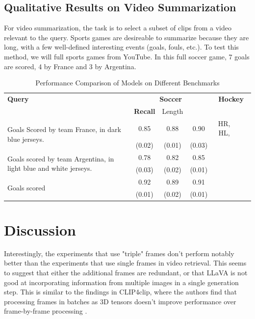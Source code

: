 \documentclass{article}
\begin{document}
\subsection{Qualitative Results on Video Summarization}
For video summarization, the task is to select a subset of clips from a video relevant to the query.
Sports games are desireable to summarize because they are long, with a few well-defined interesting events (goals, fouls, etc.).
To test this method, we will full sports games from YouTube.
In this full soccer game, 7 goals are scored, 4 by France and 3 by Argentina.

\begin{table}[htbp]
  \centering
  \begin{tabular}{lccccc}
    \toprule
    \textbf{Query} & \multicolumn{3}{c}{\textbf{Soccer}} & \multicolumn{3}{c}{\textbf{Hockey}}\\
    \cmidrule(lr){2-4}
    & \textbf{Recall} & Length \\
    \midrule
    \multirow{2}{*}{Goals Scored by team France, in dark blue jerseys.} & 0.85 & 0.88 & 0.90 & HR, HL, \\
    & (0.02) & (0.01) & (0.03) \\
    \midrule
    \multirow{2}{*}{Goals scored by team Argentina, in light blue and white jerseys.} & 0.78 & 0.82 & 0.85 \\
    & (0.03) & (0.02) & (0.01) \\
    \midrule
    \multirow{2}{*}{Goals scored} & 0.92 & 0.89 & 0.91 \\
    & (0.01) & (0.02) & (0.01) \\
    \bottomrule
  \end{tabular}
  \label{tab:video_summarization}
  \caption{Performance Comparison of Models on Different Benchmarks}
\end{table}

\section{Discussion}

Interestingly, the experiments that use "triple" frames don't perform notably better than the experiments that use single frames in video retrieval.
This seems to suggest that either the additional frames are redundant, or that LLaVA is not good at incorporating information from multiple images in a single generation step.
This is similar to the findings in CLIP4clip, where the authors find that processing frames in batches as 3D tensors doesn't improve performance over frame-by-frame processing \cite{clip4clip}.
\end{document}

